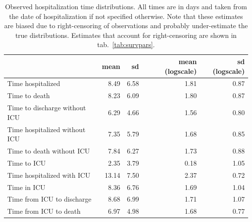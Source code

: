 {\begin{table}[t]
\caption[Observed hospitalization time distributions.]{Observed hospitalization time distributions. All times are in days and taken from the date of hospitalization if not specified otherwise. Note that these estimates are biased due to right-censoring of observations and probably under-estimate the true distributions. Estimates that account for right-censoring are shown in tab.~\ref{tab:survpars}.}
\label{tab:vdparams}
\centering
\begin{tabular}{lrrrr}
\toprule
 & mean & sd & mean (logscale) & sd (logscale)\\
\midrule
Time hospitalized & 8.49 & 6.58 & 1.81 & 0.87\\
Time to death & 8.23 & 6.09 & 1.80 & 0.87\\ \addlinespace
Time to discharge without ICU & 6.29 & 4.66 & 1.56 & 0.80\\
Time hospitalized without ICU & 7.35 & 5.79 & 1.68 & 0.85\\
Time to death without ICU & 7.84 & 6.27 & 1.73 & 0.88\\ \addlinespace
Time to ICU & 2.35 & 3.79 & 0.18 & 1.05\\
Time hospitalized with ICU & 13.14 & 7.50 & 2.37 & 0.72\\
Time in ICU & 8.36 & 6.76 & 1.69 & 1.04\\
Time from ICU to discharge & 8.68 & 6.99 & 1.71 & 1.07\\
Time from ICU to death & 6.97 & 4.98 & 1.68 & 0.77\\
\bottomrule
\end{tabular}
\end{table}


}
